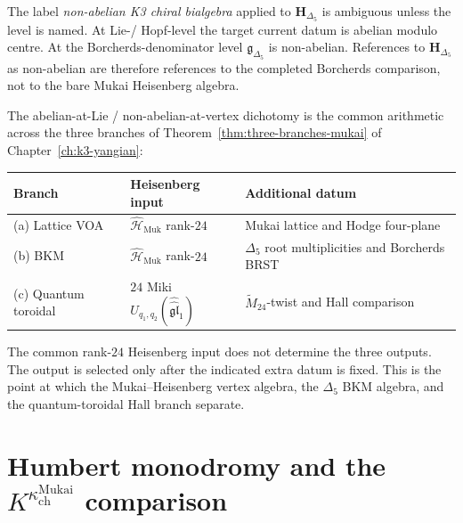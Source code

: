\begin{remark}
\label{rem:abelian-naming-discipline}
The label \emph{non-abelian K3 chiral bialgebra} applied to $\mathbf{H}_{\Delta_5}$ is
ambiguous unless the level is named. At Lie-/ Hopf-level the target current
datum is abelian modulo centre. At the Borcherds-denominator level
$\mathfrak{g}_{\Delta_5}$ is non-abelian. References to
$\mathbf{H}_{\Delta_5}$ as non-abelian are therefore references to the
completed Borcherds comparison, not to the bare Mukai Heisenberg algebra.
\end{remark}

\begin{remark}
\label{rem:abelian-three-branch-parallel}
The abelian-at-Lie / non-abelian-at-vertex dichotomy is the common arithmetic
across the three branches of
Theorem~\ref{thm:three-branches-mukai} of Chapter~\ref{ch:k3-yangian}:
\begin{center}
\renewcommand{\arraystretch}{1.3}
\begin{tabular}{@{}lll@{}}
\textbf{Branch} & \textbf{Heisenberg input} & \textbf{Additional datum} \\ \hline
(a) Lattice VOA & $\widehat{\mathcal{H}}_{\mathrm{Muk}}$ rank-$24$ & Mukai lattice and Hodge four-plane \\
(b) BKM & $\widehat{\mathcal{H}}_{\mathrm{Muk}}$ rank-$24$ & $\Delta_5$ root multiplicities and Borcherds BRST \\
(c) Quantum toroidal & $24$ Miki $U_{q_1,q_2}(\widehat{\widehat{\mathfrak{gl}}}_1)$ & $\widetilde{M}_{24}$-twist and Hall comparison
\end{tabular}
\end{center}
The common rank-$24$ Heisenberg input does not determine the three outputs.
The output is selected only after the indicated extra datum is fixed. This is
the point at which the Mukai--Heisenberg vertex algebra, the $\Delta_5$ BKM algebra, and the
quantum-toroidal Hall branch separate.
\end{remark}

\section{Humbert monodromy and the \texorpdfstring{$K^{\kappa_{\mathrm{ch}}^{\mathrm{Mukai}}}$}{K-kappa-ch-Mukai} comparison}
\label{sec:humbert-monodromy-platonic}

